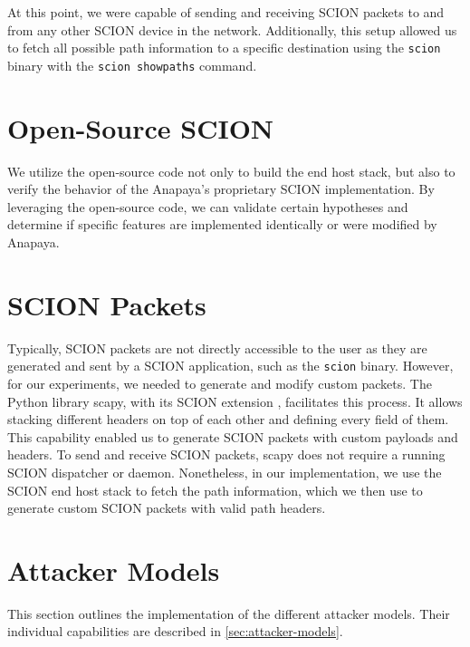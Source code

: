 At this point, we were capable of sending and receiving SCION packets to and from any other SCION device in the network.
Additionally, this setup allowed us to fetch all possible path information to a specific destination using the \texttt{scion} binary with the \texttt{scion showpaths} command.


\section{Open-Source SCION}
We utilize the open-source code not only to build the end host stack, but also to verify the behavior of the Anapaya's proprietary SCION implementation.
By leveraging the open-source code, we can validate certain hypotheses and determine if specific features are implemented identically or were modified by Anapaya.


\section{SCION Packets}
\label{sec:impl:SCIONpackets}
Typically, SCION packets are not directly accessible to the user as they are generated and sent by a SCION application, such as the \texttt{scion} binary.
However, for our experiments, we needed to generate and modify custom packets.
The Python library scapy, with its SCION extension \cite{scapySCION}, facilitates this process.
It allows stacking different headers on top of each other and defining every field of them.
This capability enabled us to generate SCION packets with custom payloads and headers.
To send and receive SCION packets, scapy does not require a running SCION dispatcher or daemon.
Nonetheless, in our implementation, we use the SCION end host stack to fetch the path information, which we then use to generate custom SCION packets with valid path headers.




\section{Attacker Models}
\label{sec:impl:attackerModel}

This section outlines the implementation of the different attacker models.
Their individual capabilities are described in \cref{sec:attacker-models}.


